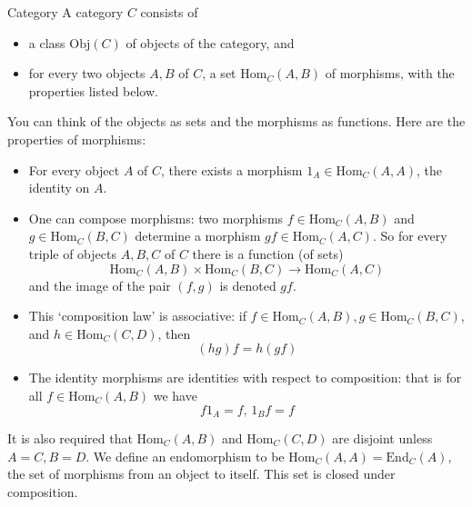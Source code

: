 \documentclass{report}
\begin{document}
\begin{definition}[\label{def:1.3.1}]{Category}
    A category $C$ consists of 
    \begin{itemize}
        \item a class $\text{Obj}(C)$ of objects of the category, and

        \item for every two objects $A, B$ of $C$, a set $\text{Hom}_{C}(A, B)$ of morphisms, with the properties listed below.
    \end{itemize}

    You can think of the objects as sets and the morphisms as functions. Here are the properties of morphisms:

    \begin{itemize}
        \item For every object $A$ of $C$, there exists a morphism $1_{A} \in \text{Hom}_{C}(A, A)$, the identity on $A$.

        \item One can compose morphisms: two morphisms $f \in \text{Hom}_{C}(A, B)$ and $g \in \text{Hom}_{C}(B, C)$ determine a morphism $gf \in \text{Hom}_{C}(A, C)$. So for every triple of objects $A, B, C$ of $C$ there is a function (of sets)
            \begin{equation*}
                \text{Hom}_{C}(A, B) \times \text{Hom}_{C}(B, C) \rightarrow \text{Hom}_{C}(A, C)
            \end{equation*}
            and the image of the pair $(f, g)$ is denoted $gf$.

        \item This `composition law' is associative: if $f \in \text{Hom}_{C}(A, B), g \in \text{Hom}_{C}(B, C)$, and $h \in \text{Hom}_{C}(C, D)$, then 
            \begin{equation*}
                (hg)f = h(gf)
            \end{equation*}

        \item The identity morphisms are identities with respect to composition: that is for all $f \in \text{Hom}_{C}(A, B)$ we have
            \begin{equation*}
                f1_{A} = f, \, 1_{B}f = f
            \end{equation*}
    \end{itemize}
\end{definition}

It is also required that $\text{Hom}_{C}(A, B)$ and $\text{Hom}_{C}(C, D)$ are disjoint unless $A = C, B = D$. We define an endomorphism to be $\text{Hom}_{C}(A, A) = \text{End}_{C}(A)$, the set of morphisms from an object to itself. This set is closed under composition.
\end{document}
